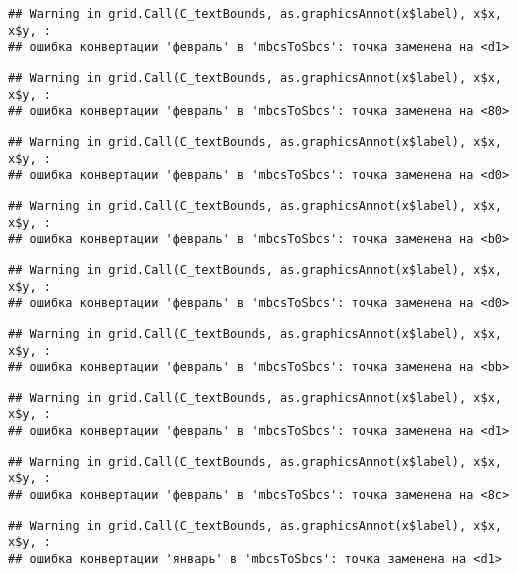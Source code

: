 \documentclass[
]{article}
\begin{document}
\begin{verbatim}
## Warning in grid.Call(C_textBounds, as.graphicsAnnot(x$label), x$x, x$y, :
## ошибка конвертации 'февраль' в 'mbcsToSbcs': точка заменена на <d1>
\end{verbatim}

\begin{verbatim}
## Warning in grid.Call(C_textBounds, as.graphicsAnnot(x$label), x$x, x$y, :
## ошибка конвертации 'февраль' в 'mbcsToSbcs': точка заменена на <80>
\end{verbatim}

\begin{verbatim}
## Warning in grid.Call(C_textBounds, as.graphicsAnnot(x$label), x$x, x$y, :
## ошибка конвертации 'февраль' в 'mbcsToSbcs': точка заменена на <d0>
\end{verbatim}

\begin{verbatim}
## Warning in grid.Call(C_textBounds, as.graphicsAnnot(x$label), x$x, x$y, :
## ошибка конвертации 'февраль' в 'mbcsToSbcs': точка заменена на <b0>
\end{verbatim}

\begin{verbatim}
## Warning in grid.Call(C_textBounds, as.graphicsAnnot(x$label), x$x, x$y, :
## ошибка конвертации 'февраль' в 'mbcsToSbcs': точка заменена на <d0>
\end{verbatim}

\begin{verbatim}
## Warning in grid.Call(C_textBounds, as.graphicsAnnot(x$label), x$x, x$y, :
## ошибка конвертации 'февраль' в 'mbcsToSbcs': точка заменена на <bb>
\end{verbatim}

\begin{verbatim}
## Warning in grid.Call(C_textBounds, as.graphicsAnnot(x$label), x$x, x$y, :
## ошибка конвертации 'февраль' в 'mbcsToSbcs': точка заменена на <d1>
\end{verbatim}

\begin{verbatim}
## Warning in grid.Call(C_textBounds, as.graphicsAnnot(x$label), x$x, x$y, :
## ошибка конвертации 'февраль' в 'mbcsToSbcs': точка заменена на <8c>
\end{verbatim}

\begin{verbatim}
## Warning in grid.Call(C_textBounds, as.graphicsAnnot(x$label), x$x, x$y, :
## ошибка конвертации 'январь' в 'mbcsToSbcs': точка заменена на <d1>
\end{verbatim}
\end{document}
